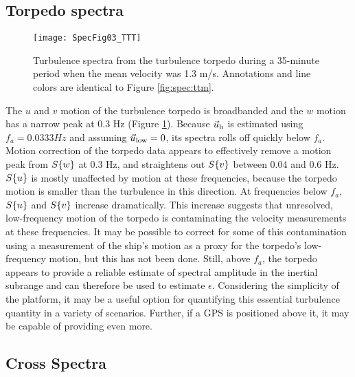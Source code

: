 \subsection{Torpedo spectra}

\begin{figure}[t]
  \centering
  \texttt{[image: SpecFig03\_TTT]}
  \caption{Turbulence spectra from the turbulence torpedo during a 35-minute period when the mean velocity was 1.3 m/s. Annotations and line colors are identical to Figure \ref{fig:spec:ttm}.}
  \label{fig:spec:torpedo}
\end{figure}

The $u$ and $v$ motion of the turbulence torpedo is broadbanded and the $w$ motion has a narrow peak at 0.3 Hz (Figure \ref{fig:spec:torpedo}). Because $\vec{u}_\mathrm{h}$ is estimated using $f_a = 0.0333Hz$ and assuming $\vec{u}_\mathrm{low}=0$, its spectra rolls off quickly below $f_a$.  Motion correction of the torpedo data appears to effectively remove a motion peak from $S\{w\}$ at 0.3 Hz, and straightens out $S\{v\}$ between 0.04 and 0.6 Hz. $S\{u\}$ is mostly unaffected by motion at these frequencies, because the torpedo motion is smaller than the turbulence in this direction. At frequencies below $f_a$, $S\{u\}$ and $S\{v\}$ increase dramatically. This increase suggests that unresolved, low-frequency motion of the torpedo is contaminating the velocity measurements at these frequencies. It may be possible to correct for some of this contamination using a measurement of the ship's motion as a proxy for the torpedo's low-frequency motion, but this has not been done. Still, above $f_a$, the torpedo appears to provide a reliable estimate of spectral amplitude in the inertial subrange and can therefore be used to estimate $\epsilon$. Considering the simplicity of the platform, it may be a useful option for quantifying this essential turbulence quantity in a variety of scenarios. Further, if a GPS is positioned above it, it may be capable of providing even more.


\subsection{Cross Spectra}

